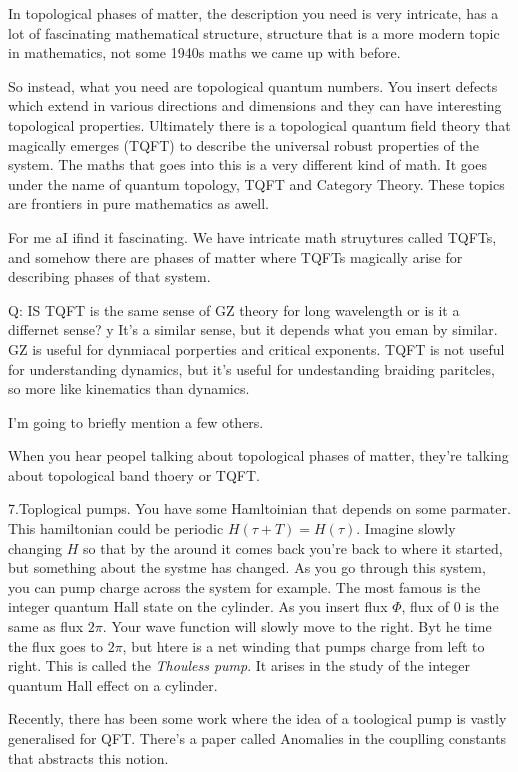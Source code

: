 In topological phases of matter, the description you need is very intricate, has
a lot of fascinating mathematical structure, structure that is a more modern
topic in mathematics, not some 1940s maths we came up with before.

So instead, what you need are topological quantum numbers.
You insert defects which extend in various directions and dimensions and they
can have interesting topological properties.
Ultimately there is a topological quantum field theory that magically emerges
(TQFT) to describe the universal robust properties of the system.
The maths that goes into this is a very different kind of math.
It goes under the name of quantum topology, TQFT and Category Theory.
These topics are frontiers in pure mathematics as awell.

For me aI ifind it fascinating.
We have intricate math struytures called TQFTs, and somehow there are phases of
matter where TQFTs magically arise for describing phases of that system.

Q: IS TQFT is the same sense of GZ theory for long wavelength or is it a
differnet sense?
y
It's a similar sense, but it depends what you eman by similar.
GZ is useful for dynmiacal porperties and critical exponents.
TQFT is not useful for understanding dynamics, but it's useful for undestanding
braiding paritcles, so more like kinematics than dynamics.


I'm going to briefly mention a few others.

When you hear peopel talking about topological phases of matter, they're talking
about topological band thoery or TQFT.

7.Toplogical pumps.
You have some Hamltoinian that depends on some parmater.
This hamiltonian could be periodic $H(\tau + T) = H(\tau)$.
Imagine slowly changing $H$ so that by the around it comes back you're back to
where it started, but something about the systme has changed.
As you go through this system, you can pump charge across the system for
example.
The most famous is the integer quantum Hall state on the cylinder.
As you insert flux $\Phi$, flux of $0$ is the same as flux $2\pi$.
Your wave function will slowly move to the right.
Byt he time the flux goes to $2\pi$, but htere is a net winding that pumps
charge from left to right.
This is called the \emph{Thouless pump}.
It arises in the study of the integer quantum Hall effect on a cylinder.

Recently, there has been some work where the idea of a toological pump is vastly
generalised for QFT.
There's a paper called Anomalies in the couplling constants that abstracts this
notion.

